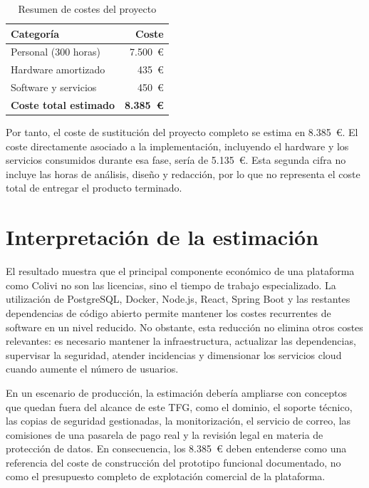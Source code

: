 \begin{table}[H]
    \centering
    \caption{Resumen de costes del proyecto}
    \label{tab:resumen_costes}
    \begin{tabular}{|p{9cm}|r|}
        \hline
        \textbf{Categoría} & \textbf{Coste} \\
        \hline
        Personal (300 horas) & 7.500~\euro \\
        \hline
        Hardware amortizado & 435~\euro \\
        \hline
        Software y servicios & 450~\euro \\
        \hline
        \textbf{Coste total estimado} & \textbf{8.385~\euro} \\
        \hline
    \end{tabular}
\end{table}

Por tanto, el coste de sustitución del proyecto completo se estima en 8.385~\euro. El coste directamente asociado a la implementación, incluyendo el hardware y los servicios consumidos durante esa fase, sería de 5.135~\euro. Esta segunda cifra no incluye las horas de análisis, diseño y redacción, por lo que no representa el coste total de entregar el producto terminado.

\section{Interpretación de la estimación}
\label{sec:interpretacion_costes}

El resultado muestra que el principal componente económico de una plataforma como Colivi no son las licencias, sino el tiempo de trabajo especializado. La utilización de PostgreSQL, Docker, Node.js, React, Spring Boot y las restantes dependencias de código abierto permite mantener los costes recurrentes de software en un nivel reducido. No obstante, esta reducción no elimina otros costes relevantes: es necesario mantener la infraestructura, actualizar las dependencias, supervisar la seguridad, atender incidencias y dimensionar los servicios cloud cuando aumente el número de usuarios.

En un escenario de producción, la estimación debería ampliarse con conceptos que quedan fuera del alcance de este TFG, como el dominio, el soporte técnico, las copias de seguridad gestionadas, la monitorización, el servicio de correo, las comisiones de una pasarela de pago real y la revisión legal en materia de protección de datos. En consecuencia, los 8.385~\euro{} deben entenderse como una referencia del coste de construcción del prototipo funcional documentado, no como el presupuesto completo de explotación comercial de la plataforma.
